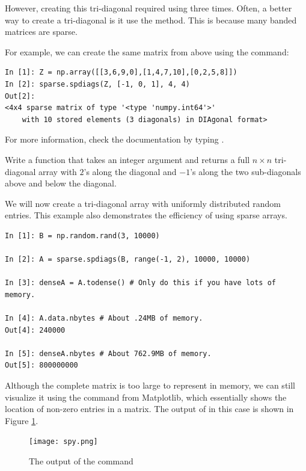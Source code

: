 However, creating this tri-diagonal required using  three times. Often, a better way to create a tri-diagonal is it use the  method.
This is because many banded matrices are sparse.

For example, we can create the same matrix from above using the command:
\begin{lstlisting}
In [1]: Z = np.array([[3,6,9,0],[1,4,7,10],[0,2,5,8]])
In [2]: sparse.spdiags(Z, [-1, 0, 1], 4, 4)
Out[2]: 
<4x4 sparse matrix of type '<type 'numpy.int64'>'
	with 10 stored elements (3 diagonals) in DIAgonal format>

\end{lstlisting}

For more information, check the documentation by typing .

\begin{problem}
Write a function that takes an integer argument  and returns a full $n\times n$
tri-diagonal array with $2$'s along the diagonal and $-1$'s along
the two sub-diagonals above and below the diagonal.
\label{full_tridiag}
\end{problem}

We will now create a tri-diagonal array with uniformly distributed random entries. This example also demonstrates the efficiency of using sparse arrays.

\begin{lstlisting}
In [1]: B = np.random.rand(3, 10000)

In [2]: A = sparse.spdiags(B, range(-1, 2), 10000, 10000)

In [3]: denseA = A.todense() # Only do this if you have lots of memory.

In [4]: A.data.nbytes # About .24MB of memory.
Out[4]: 240000

In [5]: denseA.nbytes # About 762.9MB of memory.
Out[5]: 800000000

\end{lstlisting}

Although the complete matrix is too large to represent in memory,
we can still visualize it using the  command from Matplotlib,
which essentially shows the location of non-zero entries in a matrix.
The output of  in this case is shown in Figure \ref{fig:mpl_spy}.

\begin{figure}
\centering
\texttt{[image: spy.png]}
\caption{The output of the  command}
\label{fig:mpl_spy}
\end{figure}

